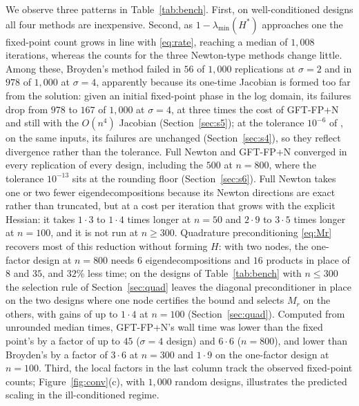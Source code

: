 \documentclass[11pt]{article}
\begin{document}
We observe three patterns in Table~\ref{tab:bench}. First, on well-conditioned
designs all four methods are inexpensive. Second, as $1-\lambda_{\min}(H^{\ast})$ approaches one the
fixed-point count grows in line with \eqref{eq:rate}, reaching a median
of $1{,}008$ iterations, whereas the counts for the three Newton-type
methods change little. Among these, Broyden's method failed in $56$ of
$1{,}000$ replications at $\sigma=2$ and in $978$ of $1{,}000$ at
$\sigma=4$, apparently because its one-time Jacobian is formed too far
from the solution: given an initial fixed-point phase in the log
domain, its failures drop from $978$ to $167$ of $1{,}000$ at
$\sigma=4$, at three times the cost of GFT-FP+N and still with the
$O(n^{4})$ Jacobian (Section~\ref{sec:s5}); at the tolerance
$10^{-6}$ of \citet{ChenFeiYu:2025}, on the same inputs, its failures
are unchanged (Section~\ref{sec:s4}), so they reflect divergence
rather than the tolerance. Full Newton and GFT-FP+N converged in
every replication of every design, including the $500$ at $n=800$,
where the tolerance $10^{-13}$ sits at the rounding floor
(Section~\ref{sec:s6}). Full Newton takes one or two fewer
eigendecompositions because its Newton directions are exact rather
than truncated, but at a cost per iteration that grows with the
explicit Hessian: it takes $1{\cdot}3$ to $1{\cdot}4$ times longer at
$n=50$ and $2{\cdot}9$ to $3{\cdot}5$ times longer at $n=100$, and it
is not run at $n\geq300$. Quadrature preconditioning \eqref{eq:Mr}
recovers most of this reduction without forming $H$: with two nodes,
the one-factor design at $n=800$ needs $6$ eigendecompositions and
$16$ products in place of $8$ and $35$, and $32$\% less time; on
the designs of Table~\ref{tab:bench} with $n\leq300$ the selection
rule of Section~\ref{sec:quad} leaves the diagonal preconditioner in
place on the two designs where one node certifies the bound and
selects $M_r$ on the others, with gains of up to $1{\cdot}4$ at
$n=100$ (Section~\ref{sec:quad}). Computed from unrounded median times,
GFT-FP+N's wall time was lower than the fixed point's by a factor of
up to $45$ ($\sigma=4$ design) and $6{\cdot}6$ ($n=800$), and lower
than Broyden's by a factor of $3{\cdot}6$ at $n=300$ and $1{\cdot}9$
on the one-factor design at $n=100$. Third,
the local factors in the last column track the observed fixed-point
counts; Figure~\ref{fig:conv}(c), with $1{,}000$ random designs,
illustrates the predicted scaling in the ill-conditioned regime.
\end{document}
